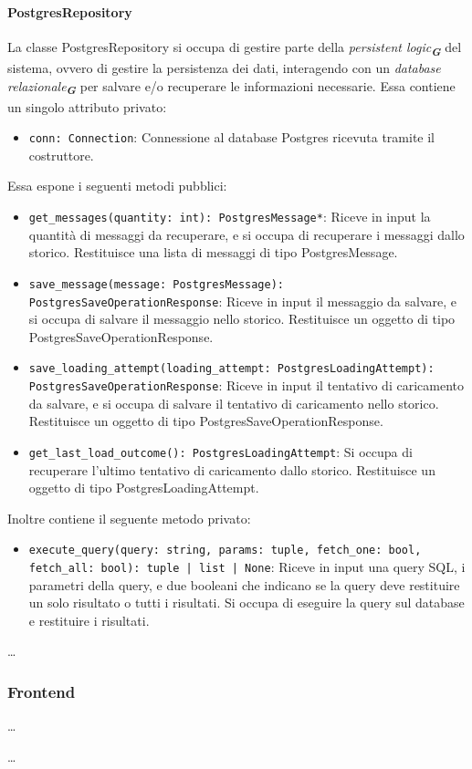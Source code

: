 \label{sec:repository}

\paragraph{PostgresRepository}
\label{sec:postgres_repository}
La classe PostgresRepository si occupa di gestire parte della \emph{persistent logic}\textsubscript{\textbf{\textit{G}}} del sistema, ovvero di gestire la persistenza dei dati, interagendo con un \emph{database relazionale}\textsubscript{\textbf{\textit{G}}} per salvare e/o recuperare le informazioni necessarie. 
Essa contiene un singolo attributo privato:
\begin{itemize}
    \item \texttt{conn: Connection}: Connessione al database Postgres ricevuta tramite il costruttore.
\end{itemize}
Essa espone i seguenti metodi pubblici:
\begin{itemize}
    \item \texttt{get\_messages(quantity: int): PostgresMessage*}: Riceve in input la quantità di messaggi da recuperare, e si occupa di recuperare i messaggi dallo storico. Restituisce una lista di messaggi di tipo PostgresMessage.
    \item \texttt{save\_message(message: PostgresMessage): PostgresSaveOperationResponse}: Riceve in input il messaggio da salvare, e si occupa di salvare il messaggio nello storico. Restituisce un oggetto di tipo PostgresSaveOperationResponse.
    \item \texttt{save\_loading\_attempt(loading\_attempt: PostgresLoadingAttempt): PostgresSaveOperationResponse}: Riceve in input il tentativo di caricamento da salvare, e si occupa di salvare il tentativo di caricamento nello storico. Restituisce un oggetto di tipo PostgresSaveOperationResponse.
    \item \texttt{get\_last\_load\_outcome(): PostgresLoadingAttempt}: Si occupa di recuperare l'ultimo tentativo di caricamento dallo storico. Restituisce un oggetto di tipo PostgresLoadingAttempt.
\end{itemize}
Inoltre contiene il seguente metodo privato:
\begin{itemize}
    \item \texttt{execute\_query(query: string, params: tuple, fetch\_one: bool, fetch\_all: bool): tuple | list | None}: Riceve in input una query SQL, i parametri della query, e due booleani che indicano se la query deve restituire un solo risultato o tutti i risultati. Si occupa di eseguire la query sul database e restituire i risultati.
\end{itemize}
\dots



\subsubsection{Frontend}
\label{sec:frontend}

\label{sec:component}

\dots


\label{sec:service_frontend}

\dots
